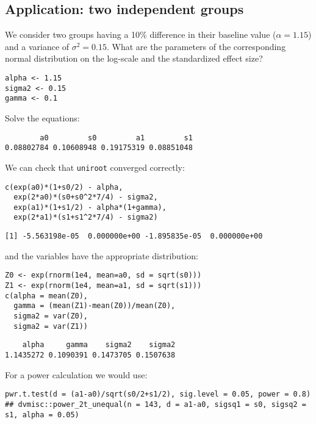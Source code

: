 \documentclass[12pt]{article}
\begin{document}
\subsection{Application: two independent groups}
\label{sec:orgf55b225}

We consider two groups having a 10\% difference in their baseline value
(\(\alpha=1.15\)) and a variance of \(\sigma^2 = 0.15\). What are the
parameters of the corresponding normal distribution on the log-scale
and the standardized effect size?
\lstset{language=r,label= ,caption= ,captionpos=b,numbers=none}
\begin{lstlisting}
alpha <- 1.15
sigma2 <- 0.15
gamma <- 0.1
\end{lstlisting}

Solve the equations:
\begin{verbatim}
        a0         s0         a1         s1 
0.08802784 0.10608948 0.19175319 0.08851048
\end{verbatim}

We can check that \texttt{uniroot} converged correctly:
\lstset{language=r,label= ,caption= ,captionpos=b,numbers=none}
\begin{lstlisting}
c(exp(a0)*(1+s0/2) - alpha, 
  exp(2*a0)*(s0+s0^2*7/4) - sigma2, 
  exp(a1)*(1+s1/2) - alpha*(1+gamma), 
  exp(2*a1)*(s1+s1^2*7/4) - sigma2)
\end{lstlisting}

\begin{verbatim}
[1] -5.563198e-05  0.000000e+00 -1.895835e-05  0.000000e+00
\end{verbatim}

and the variables have the appropriate distribution:
\lstset{language=r,label= ,caption= ,captionpos=b,numbers=none}
\begin{lstlisting}
Z0 <- exp(rnorm(1e4, mean=a0, sd = sqrt(s0)))
Z1 <- exp(rnorm(1e4, mean=a1, sd = sqrt(s1)))
c(alpha = mean(Z0), 
  gamma = (mean(Z1)-mean(Z0))/mean(Z0), 
  sigma2 = var(Z0), 
  sigma2 = var(Z1))
\end{lstlisting}

\begin{verbatim}
    alpha     gamma    sigma2    sigma2 
1.1435272 0.1090391 0.1473705 0.1507638
\end{verbatim}

For a power calculation we would use:
\lstset{language=r,label= ,caption= ,captionpos=b,numbers=none}
\begin{lstlisting}
pwr.t.test(d = (a1-a0)/sqrt(s0/2+s1/2), sig.level = 0.05, power = 0.8)
## dvmisc::power_2t_unequal(n = 143, d = a1-a0, sigsq1 = s0, sigsq2 = s1, alpha = 0.05)
\end{lstlisting}
\end{document}
